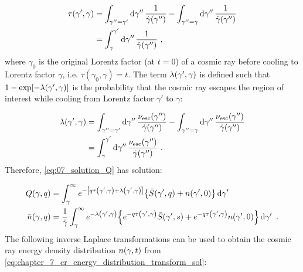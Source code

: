 \begin{equation}
    \begin{aligned}
    \tau\qty(\gamma', \gamma) &= \int_{\gamma''=\gamma'} \dd{\gamma''}\frac{1}{\dot{\gamma}\qty(\gamma'')} - \int_{\gamma''=\gamma} \dd{\gamma''}\frac{1}{\dot{\gamma}\qty(\gamma'')}\\
    &=\int_\gamma^{\gamma'}\dd{\gamma''}\frac{1}{\dot{\gamma}\qty(\gamma'')}\text{ ,}
    \end{aligned} \label{eq:chapter_7_cooling_time}
\end{equation}
\noindent where $\gamma_0$ is the original Lorentz factor (at $t=0$) of a cosmic ray before cooling to Lorentz factor $\gamma$, i.e. $\tau(\gamma_0,\gamma)=t$. The term $\lambda\qty(\gamma',\gamma)$ is defined such that $1-\exp[-\lambda\qty(\gamma',\gamma)]$ is the probability that the cosmic ray escapes the region of interest while cooling from Lorentz factor $\gamma'$ to $\gamma$:

\begin{equation}
    \begin{aligned}
    \lambda\qty(\gamma',\gamma)&=\int_{\gamma''=\gamma'}\dd{\gamma''}\frac{\nu_\text{esc}\qty(\gamma'')}{\dot{\gamma}\qty(\gamma'')}-\int_{\gamma''=\gamma}\dd{\gamma''}\frac{\nu_\text{esc}\qty(\gamma'')}{\dot{\gamma}\qty(\gamma'')} \\
    &=\int_\gamma^{\gamma'}\dd{\gamma''}\frac{\nu_\text{esc}\qty(\gamma'')}{\dot{\gamma}\qty(\gamma'')}\text{ .}
    \end{aligned} \label{eq:chapter_7_lambda_escape_rate}
\end{equation}
\noindent Therefore, \autoref{eq:07_solution_Q} has solution:

\begin{equation}
    \begin{aligned}
        Q\qty(\gamma,q)&=\int_\gamma^\infty e^{-\qty[q\tau\qty(\gamma',\gamma)+\lambda\qty(\gamma',\gamma)]}\qty{\bar{S}\qty(\gamma',q)+n\qty(\gamma',0)}\dd{\gamma'} \\
        \bar{n}\qty(\gamma,q) &=\frac{1}{\dot{\gamma}}\int_\gamma^\infty e^{-\lambda\qty(\gamma',\gamma)} \qty{e^{-q\tau\qty(\gamma',\gamma)}\bar{S}\qty(\gamma',s)+e^{-q\tau\qty(\gamma',\gamma)}n\qty(\gamma',0)}\dd{\gamma'}\text{ .}
    \end{aligned} \label{eq:chapter_7_cr_energy_distribution_transform_sol}
\end{equation}
\noindent The following inverse Laplace transformations can be used to obtain the cosmic ray energy density distribution $n\qty(\gamma,t)$ from \autoref{eq:chapter_7_cr_energy_distribution_transform_sol}:

